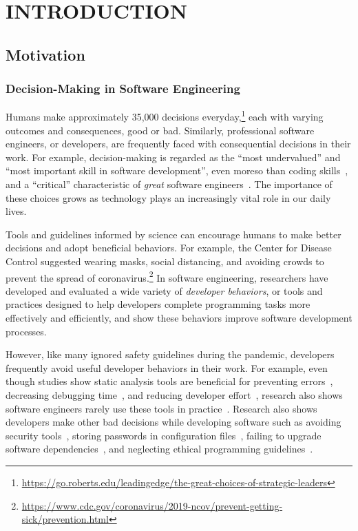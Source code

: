 \chapter{INTRODUCTION}
\label{chap-intro}

\section{Motivation}

\subsection*{Decision-Making in Software Engineering}
Humans make approximately 35,000 decisions everyday,\footnote{\url{https://go.roberts.edu/leadingedge/the-great-choices-of-strategic-leaders}} each with varying outcomes and consequences, good or bad. Similarly, professional software engineers, or developers, are frequently faced with consequential decisions in their work. For example, decision-making is regarded as the ``most undervalued'' and ``most important skill in software development'', even moreso than coding skills~\cite{WooDecision}, and a ``critical'' characteristic of \textit{great} software engineers~\cite{GreatSoftwareEngineer}. The importance of these choices grows as technology plays an increasingly vital role in our daily lives.

Tools and guidelines informed by science can encourage humans to make better decisions and adopt beneficial behaviors. For example, the Center for Disease Control suggested wearing masks, social distancing, and avoiding crowds to prevent the spread of coronavirus.\footnote{\url{https://www.cdc.gov/coronavirus/2019-ncov/prevent-getting-sick/prevention.html}} In software engineering, researchers have developed and evaluated a wide variety of \textit{developer behaviors}, or tools and practices designed to help developers complete programming tasks more effectively and efficiently, and show these behaviors improve software development processes.



However, like many ignored safety guidelines during the pandemic, developers frequently avoid useful developer behaviors in their work. For example, even though studies show static analysis tools are beneficial for preventing errors~\cite{GoogleFixit}, decreasing debugging time~\cite{Williams2007FaultFixTime}, and reducing developer effort~\cite{singh2017staticreview}, research also shows software engineers rarely use these tools in practice~\cite{Johnson2013Why}. Research also shows developers make other bad decisions while developing software such as avoiding security tools~\cite{Witschey2015Quantifying}, storing passwords in configuration files~\cite{Akond2019PropertiesIAC}, failing to upgrade software dependencies~\cite{Samim2017AutoPullRequests}, and neglecting ethical programming guidelines~\cite{McNamaraSmithE2018ACM}.

